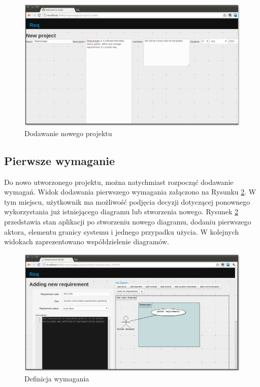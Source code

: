       \begin{figure}[t]
        \centering
        \includegraphics[width=1.0\textwidth]{img/tut_2.png}
        \caption{Dodawanie nowego projektu}
        \label{fig:addProj}
      \end{figure}

    \subsection{Pierwsze wymaganie}

      Do nowo utworzonego projektu, można natychmiast rozpocząć dodawanie wymagań. Widok dodawania pierwszego wymagania załączono na Rysunku \ref{fig:addReq}. W tym miejscu, użytkownik ma możliwość podjęcia decyzji dotyczącej ponownego wykorzystania już istniejącego diagramu lub stworzenia nowego. Rysunek \ref{fig:addReq} przedstawia stan aplikacji po stworzeniu nowego diagramu, dodaniu pierwszego aktora, elementu granicy systemu i jednego przypadku użycia. W kolejnych widokach zaprezentowano współdzielenie diagramów.

      \begin{figure}[t]
        \centering
        \includegraphics[width=1.0\textwidth]{img/tut_3.png}
        \caption{Definicja wymagania}
        \label{fig:addReq}
      \end{figure}


